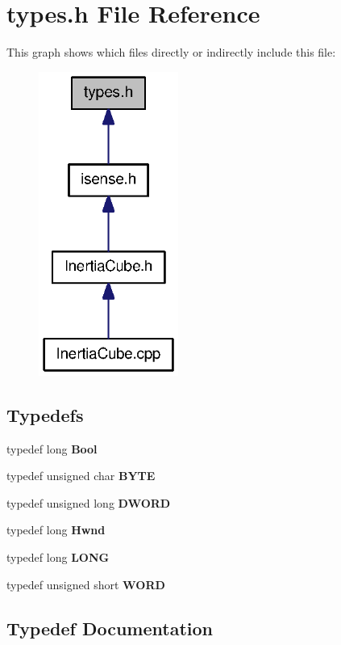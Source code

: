 \section{types.\-h \-File \-Reference}
\label{types_8h}
\-This graph shows which files directly or indirectly include this file\-:
\nopagebreak
\begin{figure}[H]
\begin{center}
\leavevmode
\includegraphics[width=130pt]{types_8h__dep__incl}
\end{center}
\end{figure}
\subsection*{\-Typedefs}
\begin{DoxyCompactItemize}
\item 
typedef long {\bf \-Bool}
\item 
typedef unsigned char {\bf \-B\-Y\-T\-E}
\item 
typedef unsigned long {\bf \-D\-W\-O\-R\-D}
\item 
typedef long {\bf \-Hwnd}
\item 
typedef long {\bf \-L\-O\-N\-G}
\item 
typedef unsigned short {\bf \-W\-O\-R\-D}
\end{DoxyCompactItemize}


\subsection{\-Typedef \-Documentation}
